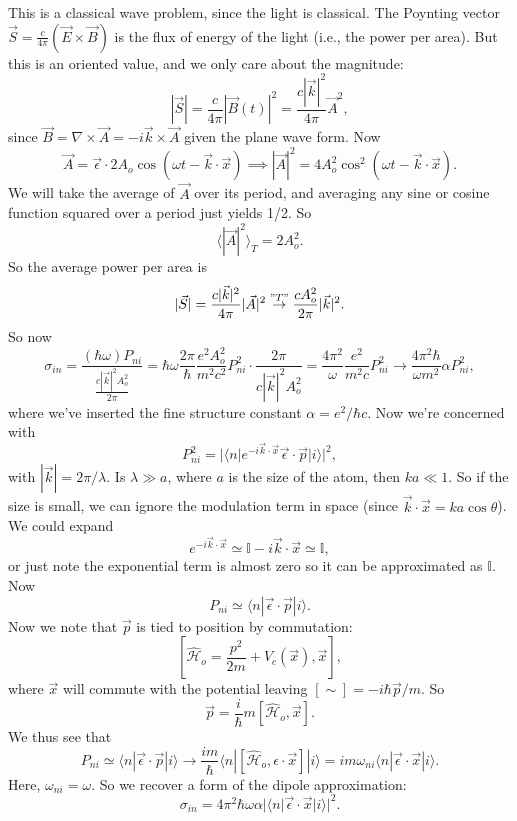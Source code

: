 \documentclass[fontsize=12pt]{scrartcl}
\newcommand{\bb}[1]{\mathbb{#1}}
\newcommand{\Id}{\bb{I}}
\newcommand{\la}{\langle}
\newcommand{\ra}{\rangle}
\newcommand{\Ham}{\hat{\mathcal{H}}}
\begin{document}
This is a classical wave problem, since the light is classical. The Poynting vector $\vec{S}=\frac{c}{4\pi}(\vec{E}\times\vec{B})$ is the flux of energy of the light (i.e., the power per area). But this is an oriented value, and we only care about the magnitude: $$|\vec{S}|=\frac{c}{4\pi}|\vec{B}(t)|^2 = \frac{c|\vec{k}|^2}{4\pi}\vec{A}^2,$$ since $\vec{B}=\nabla\times\vec{A}=-i\vec{k}\times\vec{A}$ given the plane wave form. Now $$\vec{A}=\vec{\epsilon}\cdot 2A_o\cos(\omega t-\vec{k}\cdot\vec{x})\implies |\vec{A}|^2 = 4A_o^2\cos^2(\omega t-\vec{k}\cdot\vec{x}).$$ We will take the average of $\vec{A}$ over its period, and averaging any sine or cosine function squared over a period just yields 1/2. So $$\la |\vec{A}|^2\ra_T=2A_o^2.$$ So the average power per area is $$|\vec{S}|=\frac{c|\vec{k}|^2}{4\pi}|\vec{A}|^2\overset{"T"}{\to}\frac{cA_o^2}{2\pi}|\vec{k}|^2.$$ So now $$\sigma_{in}=\frac{(\hbar\omega)P_{ni}}{\frac{c|\vec{k}|^2A_o^2}{2\pi}} = \hbar\omega\frac{2\pi}{\hbar} \frac{e^2A_o^2}{m^2c^2}P_{ni}^2\cdot\frac{2\pi}{c|\vec{k}|^2A_o^2}=\frac{4\pi^2}{\omega}\frac{e^2}{m^2c}P_{ni}^2\to \frac{4\pi^2\hbar}{\omega m^2}\alpha P_{ni}^2,$$ where we've inserted the fine structure constant $\alpha=e^2/\hbar c.$ Now we're concerned with $$P_{ni}^2 = |\la n | e^{-i\vec{k}\cdot\vec{x}}\vec{\epsilon}\cdot\vec{p}|i\ra|^2,$$ with $|\vec{k}| = 2\pi/\lambda$. Is $\lambda \gg a$, where $a$ is the size of the atom, then $ka\ll 1$. So if the size is small, we can ignore the modulation term in space (since $\vec{k}\cdot\vec{x}=ka\cos\theta$). We could expand $$e^{-i\vec{k}\cdot\vec{x}}\simeq \Id - i\vec{k}\cdot\vec{x}\simeq \Id,$$ or just note the exponential term is almost zero so it can be approximated as $\Id$. Now $$P_{ni}\simeq \la n |\vec{\epsilon}\cdot\vec{p}|i\ra.$$ Now we note that $\vec{p}$ is tied to position by commutation: $$\left[\Ham_o=\frac{p^2}{2m}+V_c(\vec{x}), \vec{x}\right],$$  where $\vec{x}$ will commute with the potential leaving $[\sim]=-i\hbar \vec{p}/m.$ So $$\vec{p}=\frac{i}{\hbar}m [\Ham_o, \vec{x}].$$ We thus see that $$P_{ni}\simeq \la n |\vec{\epsilon}\cdot\vec{p}|i\ra \to \frac{im}{\hbar}\la n |[\Ham_o, \epsilon\cdot\vec{x}]|i\ra = im\omega_{ni}\la n|\vec{\epsilon}\cdot\vec{x}|i\ra.$$ Here, $\omega_{ni}=\omega$. So we recover a form of the dipole approximation: $$\sigma_{in}=4\pi^2\hbar\omega\alpha|\la n |\vec{\epsilon}\cdot\vec{x}|i\ra|^2.$$
\end{document}
